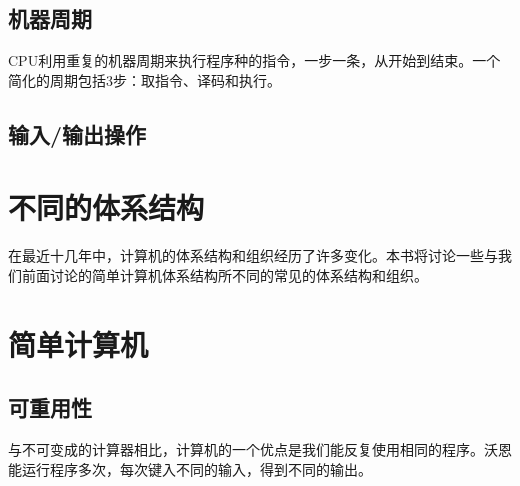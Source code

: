 \subsection{机器周期}
CPU利用重复的机器周期来执行程序种的指令，一步一条，从开始到结束。一个简化的周期包括3步：取指令、译码和执行。
\subsection{输入/输出操作}
\section{不同的体系结构}
在最近十几年中，计算机的体系结构和组织经历了许多变化。本书将讨论一些与我们前面讨论的简单计算机体系结构所不同的常见的体系结构和组织。
\section{简单计算机}
\subsection{可重用性}
与不可变成的计算器相比，计算机的一个优点是我们能反复使用相同的程序。沃恩能运行程序多次，每次键入不同的输入，得到不同的输出。